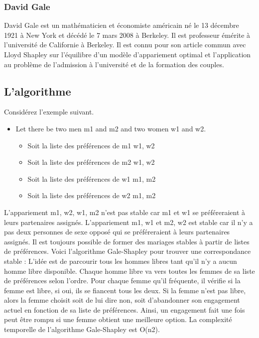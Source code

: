 \subsubsection{David Gale}
\par David Gale est un mathématicien et économiste américain né le 13 décembre 1921 à New York et décédé le 7 mars 2008 à Berkeley. Il est professeur émérite à l'université de Californie à Berkeley. Il est connu pour son article commun avec Lloyd Shapley sur l'équilibre d'un modèle d'appariement optimal et l'application au problème de l'admission à l'université et de la formation des couples. \cite{David_Gale}
\subsection{L'algorithme}
Considérez l'exemple suivant.
\begin{itemize}
\item Let there be two men m1 and m2 and two women w1 and w2. 
\begin{itemize}
\item Soit la liste des préférences de m1 {w1, w2}
\item Soit la liste des préférences de m2 {w1, w2}
\item Soit la liste des préférences de w1 {m1, m2}
\item  Soit la liste des préférences de w2 {m1, m2}
\end{itemize}
\end{itemize}

L'appariement { {m1, w2}, {w1, m2} } n'est pas stable car m1 et w1 se préféreraient à leurs partenaires assignés. L'appariement {m1, w1} et {m2, w2} est stable car il n'y a pas deux personnes de sexe opposé qui se préféreraient à leurs partenaires assignés.
Il est toujours possible de former des mariages stables à partir de listes de préférences. Voici l'algorithme Gale-Shapley pour trouver une correspondance stable :
L'idée est de parcourir tous les hommes libres tant qu'il n'y a aucun homme libre disponible. Chaque homme libre va vers toutes les femmes de sa liste de préférences selon l'ordre. Pour chaque femme qu'il fréquente, il vérifie si la femme est libre, si oui, ils se fiancent tous les deux. Si la femme n'est pas libre, alors la femme choisit soit de lui dire non, soit d'abandonner son engagement actuel en fonction de sa liste de préférences. Ainsi, un engagement fait une fois peut être rompu si une femme obtient une meilleure option. La complexité temporelle de l'algorithme Gale-Shapley est O(n2).

